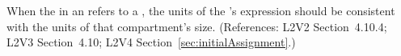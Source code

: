 When the  in an \InitialAssignment refers to a
\Compartment, the units of the \InitialAssignment's  expression
should be consistent with the units of that compartment's size.  (References:
L2V2 Section~4.10.4; L2V3 Section~4.10; L2V4 Section~\ref{sec:initialAssignment}.)
